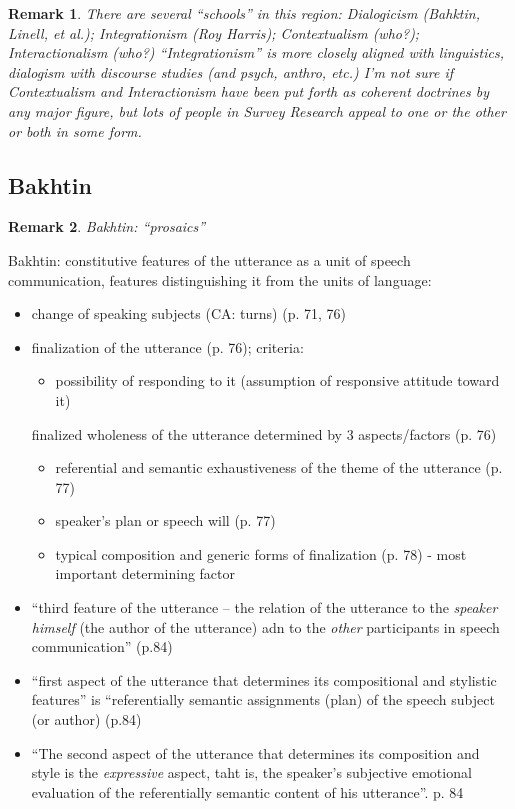 \documentclass[11pt,twoside]{article}
\newtheorem{remark}{Remark}
\newcommand{\SR}{Survey Research}
\begin{document}
\begin{remark}
  There are several ``schools'' in this region: Dialogicism (Bahktin,
  Linell, et al.); Integrationism (Roy Harris); Contextualism (who?);
  Interactionalism (who?)  ``Integrationism'' is more closely aligned
  with linguistics, dialogism with discourse studies (and psych,
  anthro, etc.)  I'm not sure if Contextualism and Interactionism have
  been put forth as coherent doctrines by any major figure, but lots
  of people in \SR{} appeal to one or the other or both in some form.
\end{remark}

\begin{abstract}

\end{abstract}

\subsection{Bakhtin}
\begin{remark}
  Bakhtin: ``prosaics''
\end{remark}

Bakhtin: constitutive features of the utterance as a unit of speech
communication, features distinguishing it from the units of language:

\begin{itemize}
\item change of speaking subjects (CA: turns) (p. 71, 76)
\item finalization of the utterance (p. 76); criteria:
\begin{itemize}
\item possibility of responding to it (assumption of responsive attitude toward it)
\end{itemize}
finalized wholeness of the utterance determined by 3 aspects/factors (p. 76)
\begin{itemize}
\item referential and semantic exhaustiveness of the theme of the utterance (p. 77)
\item speaker's plan or speech will (p. 77)
\item typical composition and generic forms of finalization (p. 78) - most important determining factor
\end{itemize}
\item ``third feature of the utterance -- the relation of the
  utterance to the \textit{speaker himself} (the author of the
  utterance) adn to the \textit{other} participants in speech
  communication'' (p.84)
\item ``first aspect of the utterance that determines its
  compositional and stylistic features'' is ``referentially semantic
  assignments (plan) of the speech subject (or author) (p.84)
\item ``The second aspect of the utterance that determines its
  composition and style is the \textit{expressive} aspect, taht is,
  the speaker's subjective emotional evaluation of the referentially
  semantic content of his utterance''. p. 84
\end{itemize}
\end{document}
